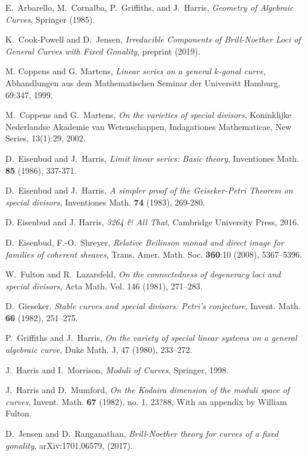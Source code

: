 \documentclass[12pt]{amsart}
\theoremstyle{definition}
\theoremstyle{remark}
\theoremstyle{remark}
\numberwithin{equation}{section}
\begin{document}
\begin{thebibliography}{}

E.~Arbarello, M.~Cornalba, P.~Griffiths, and J.~Harris, \textit{Geometry of Algebraic Curves}, Springer (1985).

 K.~Cook-Powell and D.~Jensen, \textit{Irreducible Components of Brill-Noether Loci of General Curves with Fixed Gonality}, preprint (2019).

M. Coppens and G. Martens, \textit{Linear series on a general $k$-gonal curve}, Abhandlungen aus dem Mathematischen Seminar der Universitt Hamburg, 69:347, 1999.

M.~Coppens and G.~Martens, \textit{On the varieties of special divisors}, Koninklijke Nederlandse Akademie van Wetenschappen, Indagationes Mathematicae, New Series, 13(1):29, 2002.

 D.~Eisenbud and J.~Harris, \textit{Limit linear series: Basic theory}, Inventiones Math. \textbf{85} (1986), 337-371.

 D.~Eisenbud and J.~Harris, \textit{A simpler proof of the Geiseker-Petri Theorem on special divisors}, Inventiones Math. \textbf{74} (1983), 269-280.


 D. Eisenbud and J. Harris, \textit{3264 \& All That}, Cambridge University Press, 2016.

 D.~Eisenbud, F.-O.~Shreyer, \textit{Relative Beilinson monad and direct image for families of coherent sheaves}, Trans. Amer. Math. Soc. \textbf{360}:10 (2008), 5367--5396.

W.~Fulton and R.~Lazarsfeld, \textit{On the connectedness of degeneracy loci and special divisors}, Acta Math. Vol. 146 (1981), 271--283.

 D.~Gieseker, \textit{Stable curves and special divisors: Petri's conjecture}, Invent. Math. \textbf{66} (1982), 251--275.

 P.~Griffiths and J.~Harris, \textit{On the variety of special linear systems on a general algebraic curve}, Duke Math. J, 47 (1980), 233--272.

 J.~Harris and I.~Morrison, \textit{Moduli of Curves}, Springer, 1998.

 J.~Harris and D.~Mumford, \textit{On the Kodaira dimension of the moduli space of curves}, Invent. Math. \textbf{67} (1982),
no. 1, 23?88, With an appendix by William Fulton.

D.~Jensen and D.~Ranganathan, \textit{Brill-Noether theory for curves of a fixed gonality}, arXiv:1701.06579, (2017).


\end{thebibliography}
\end{document}
